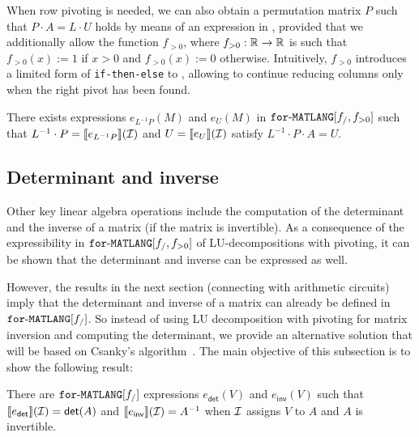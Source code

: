 When row pivoting is needed, we can also obtain a permutation matrix
$P$ such that $P\cdot A=L\cdot U$ holds by means of an expression in \langfor, provided
that we additionally allow the function $f_{>0}$, 
where $f_{>0}:\mathbb{R}\to\mathbb{R}$ is such that $f_{>0}(x):=1$ if $x>0$ and $f_{>0}(x):=0$ otherwise.
Intuitively, $f_{>0}$ introduces a limited form of \texttt{if-then-else} to \langfor, allowing to continue reducing columns only when the right pivot has been found.

\begin{proposition}\label{prop:palu}
There exists expressions $e_{L^{-1}P}(M)$ and $e_U(M)$ in $\texttt{for}\text{-}\texttt{MATLANG}[f_/,f_{>0}]$  such that
$L^{-1}\cdot P=\llbracket e_{L^{-1}P} \rrbracket(\mathcal{I})$ and $U=\llbracket e_U \rrbracket(\mathcal{I})$ satisfy $L^{-1}\cdot P\cdot A=U$.
\end{proposition}




\subsection{Determinant and inverse}\label{sec:queries:inverse}
Other key linear algebra operations include the computation of the determinant and
the inverse of a matrix (if the matrix is invertible). As a consequence of the expressibility
in $\texttt{for}\text{-}\texttt{MATLANG}[f_/,f_{>0}]$ of LU-decompositions with pivoting, it can be shown that the determinant
and inverse can be expressed as well. 

However, the results
in the next section (connecting \langfor with arithmetic circuits) imply that the determinant
and inverse of a matrix can already be defined in $\texttt{for}\text{-}\texttt{MATLANG}[f_/]$. So instead of using LU decomposition with pivoting for matrix inversion and computing the determinant, we provide an alternative solution that will be based on Csanky's algorithm~\cite{Csanky76}. The main objective of this subsection is to show the following result:

\begin{proposition}\label{prop:inverse}
    There are $\texttt{for}\text{-}\texttt{MATLANG}[f_/]$ expressions $e_{\mathsf{det}}(V)$ and $e_{\mathsf{inv}}(V)$ such that
    $\llbracket e_{\mathsf{det}} \rrbracket(\mathcal{I})=\mathsf{det}(A)$ and  
    $\llbracket e_{\mathsf{inv}} \rrbracket(\mathcal{I})=A^{-1}$ when $\mathcal{I}$ assigns $V$
    to $A$ and $A$ is invertible.
\end{proposition}

